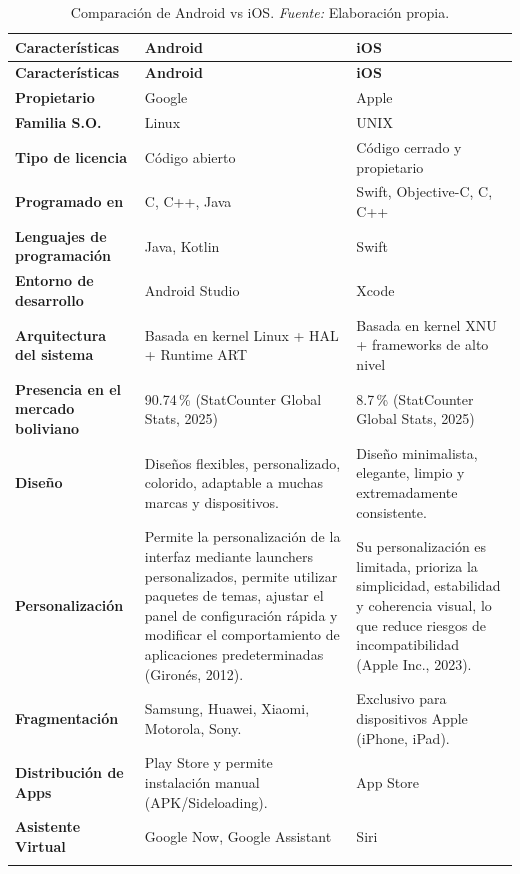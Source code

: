 {\small
\begin{longtable}{|L{3.6cm}|L{5.75cm}|L{5.3cm}|}
\hline
{} \textbf{Características} & \textbf{Android} & \textbf{iOS} \\
\hline
\endfirsthead
\hline
{} \textbf{Características} & \textbf{Android} & \textbf{iOS} \\
\hline
\endhead

\endfoot
\textbf{Propietario} & Google & Apple \\ \hline
\textbf{Familia S.O.} & Linux & UNIX \\ \hline
\textbf{Tipo de licencia} & Código abierto & Código cerrado y propietario \\ \hline
\textbf{Programado en} & C, C++, Java & Swift, Objective-C, C, C++ \\ \hline
\textbf{Lenguajes de programación} & Java, Kotlin & Swift \\ \hline
\textbf{Entorno de desarrollo} & Android Studio & Xcode \\ \hline
\textbf{Arquitectura del sistema} & Basada en kernel Linux + HAL + Runtime ART
& Basada en kernel XNU + frameworks de alto nivel \\ \hline
\textbf{Presencia en el mercado boliviano} & 90.74\,\% (StatCounter Global Stats, 2025) &
8.7\,\% (StatCounter Global Stats, 2025) \\ \hline
\textbf{Diseño} & Diseños flexibles, personalizado, colorido, adaptable a
muchas marcas y dispositivos. & Diseño minimalista, elegante, limpio y
extremadamente consistente. \\ \hline
\textbf{Personalización} & Permite la personalización de la interfaz mediante
launchers personalizados, permite utilizar paquetes de temas, ajustar el panel
de configuración rápida y modificar el comportamiento de aplicaciones
predeterminadas (Gironés, 2012). & Su personalización es limitada, prioriza la
simplicidad, estabilidad y coherencia visual, lo que reduce riesgos de
incompatibilidad (Apple Inc., 2023). \\ \hline
\textbf{Fragmentación} & Samsung, Huawei, Xiaomi, Motorola, Sony. & Exclusivo
para dispositivos Apple (iPhone, iPad). \\ \hline
\textbf{Distribución de Apps} & Play Store y permite instalación manual
(APK/Sideloading). & App Store \\ \hline
\textbf{Asistente Virtual} & Google Now, Google Assistant & Siri \\ \hline
\caption[Comparación de Android vs iOS]{Comparación de Android vs iOS. \textit{Fuente:} Elaboración propia.}\label{tab:android-ios}\\
\end{longtable}
}

